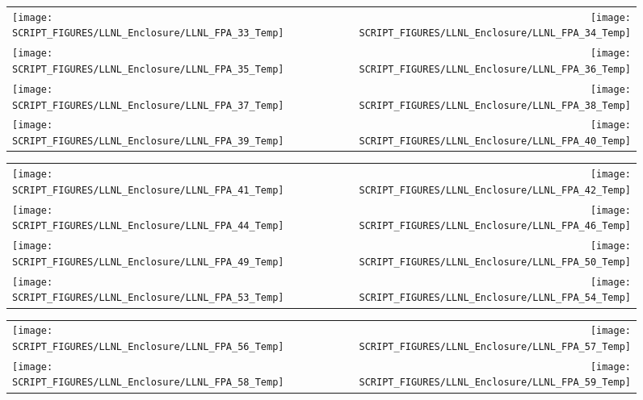 \begin{figure}[!ht]
\begin{tabular*}{\textwidth}{l@{\extracolsep{\fill}}r}
\texttt{[image: SCRIPT\_FIGURES/LLNL\_Enclosure/LLNL\_FPA\_33\_Temp]} &
\texttt{[image: SCRIPT\_FIGURES/LLNL\_Enclosure/LLNL\_FPA\_34\_Temp]} \\
\texttt{[image: SCRIPT\_FIGURES/LLNL\_Enclosure/LLNL\_FPA\_35\_Temp]} &
\texttt{[image: SCRIPT\_FIGURES/LLNL\_Enclosure/LLNL\_FPA\_36\_Temp]} \\
\texttt{[image: SCRIPT\_FIGURES/LLNL\_Enclosure/LLNL\_FPA\_37\_Temp]} &
\texttt{[image: SCRIPT\_FIGURES/LLNL\_Enclosure/LLNL\_FPA\_38\_Temp]} \\
\texttt{[image: SCRIPT\_FIGURES/LLNL\_Enclosure/LLNL\_FPA\_39\_Temp]} &
\texttt{[image: SCRIPT\_FIGURES/LLNL\_Enclosure/LLNL\_FPA\_40\_Temp]}
\end{tabular*}
\end{figure}

\begin{figure}[!ht]
\begin{tabular*}{\textwidth}{l@{\extracolsep{\fill}}r}
\texttt{[image: SCRIPT\_FIGURES/LLNL\_Enclosure/LLNL\_FPA\_41\_Temp]} &
\texttt{[image: SCRIPT\_FIGURES/LLNL\_Enclosure/LLNL\_FPA\_42\_Temp]} \\
\texttt{[image: SCRIPT\_FIGURES/LLNL\_Enclosure/LLNL\_FPA\_44\_Temp]} &
\texttt{[image: SCRIPT\_FIGURES/LLNL\_Enclosure/LLNL\_FPA\_46\_Temp]} \\
\texttt{[image: SCRIPT\_FIGURES/LLNL\_Enclosure/LLNL\_FPA\_49\_Temp]} &
\texttt{[image: SCRIPT\_FIGURES/LLNL\_Enclosure/LLNL\_FPA\_50\_Temp]} \\
\texttt{[image: SCRIPT\_FIGURES/LLNL\_Enclosure/LLNL\_FPA\_53\_Temp]} &
\texttt{[image: SCRIPT\_FIGURES/LLNL\_Enclosure/LLNL\_FPA\_54\_Temp]}
\end{tabular*}
\end{figure}

\begin{figure}[!ht]
\begin{tabular*}{\textwidth}{l@{\extracolsep{\fill}}r}
\texttt{[image: SCRIPT\_FIGURES/LLNL\_Enclosure/LLNL\_FPA\_56\_Temp]} &
\texttt{[image: SCRIPT\_FIGURES/LLNL\_Enclosure/LLNL\_FPA\_57\_Temp]} \\
\texttt{[image: SCRIPT\_FIGURES/LLNL\_Enclosure/LLNL\_FPA\_58\_Temp]} &
\texttt{[image: SCRIPT\_FIGURES/LLNL\_Enclosure/LLNL\_FPA\_59\_Temp]}
\end{tabular*}
\end{figure}

